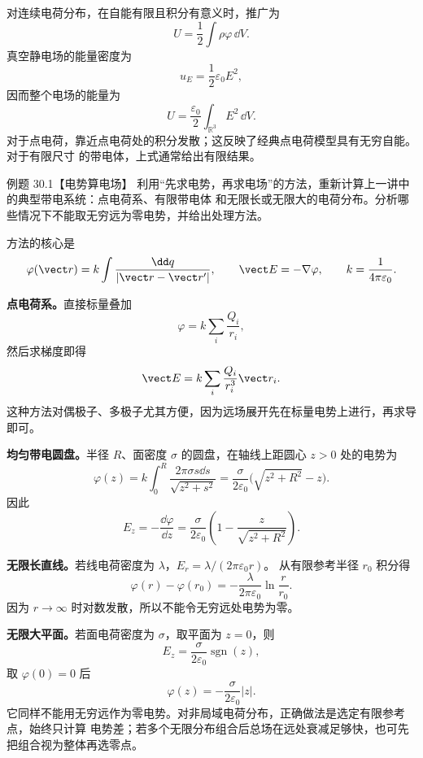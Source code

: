 对连续电荷分布，在自能有限且积分有意义时，推广为
\begin{equation}
  U=\frac12\int\rho\varphi\,\dd V.
\end{equation}
真空静电场的能量密度为
\begin{equation}
  \boxed{u_E=\frac12\varepsilon_0E^2},
\end{equation}
因而整个电场的能量为
\begin{equation}
  \boxed{U=\frac{\varepsilon_0}{2}
  \int_{\mathbb R^3}E^2\,\dd V}.
\end{equation}
对于点电荷，靠近点电荷处的积分发散；这反映了经典点电荷模型具有无穷自能。对于有限尺寸
的带电体，上式通常给出有限结果。





\Needspace{0.34\textheight}
\begin{origexamplebox}{例题 30.1【电势算电场】}
利用“先求电势，再求电场”的方法，重新计算上一讲中的典型带电系统：点电荷系、有限带电体
和无限长或无限大的电荷分布。分析哪些情况下不能取无穷远为零电势，并给出处理方法。
\end{origexamplebox}

\begin{xesolution}
方法的核心是
\[
  \varphi(\vect r)=k\int\frac{\dd q}{|\vect r-\vect r'|},
  \qquad
  \vect E=-\nabla\varphi,
  \qquad k=\frac1{4\pi\varepsilon_0}.
\]

\textbf{点电荷系。}直接标量叠加
\[
  \varphi=k\sum_i\frac{Q_i}{r_i},
\]
然后求梯度即得
\[
  \vect E=k\sum_i\frac{Q_i}{r_i^3}\vect r_i.
\]
这种方法对偶极子、多极子尤其方便，因为远场展开先在标量电势上进行，再求导即可。

\textbf{均匀带电圆盘。}半径 $R$、面密度 $\sigma$ 的圆盘，在轴线上距圆心 $z>0$ 处的电势为
\[
  \varphi(z)=k\int_0^R\frac{2\pi\sigma s\dd s}{\sqrt{z^2+s^2}}
  =\frac{\sigma}{2\varepsilon_0}
  \bigl(\sqrt{z^2+R^2}-z\bigr).
\]
因此
\[
  \boxed{E_z=-\frac{\dd\varphi}{\dd z}
  =\frac{\sigma}{2\varepsilon_0}
  \left(1-\frac{z}{\sqrt{z^2+R^2}}\right)}.
\]

\textbf{无限长直线。}若线电荷密度为 $\lambda$，$E_r=\lambda/(2\pi\varepsilon_0r)$。
从有限参考半径 $r_0$ 积分得
\[
  \boxed{\varphi(r)-\varphi(r_0)
  =-\frac{\lambda}{2\pi\varepsilon_0}\ln\frac r{r_0}}.
\]
因为 $r\to\infty$ 时对数发散，所以不能令无穷远处电势为零。

\textbf{无限大平面。}若面电荷密度为 $\sigma$，取平面为 $z=0$，则
\[
  E_z=\frac{\sigma}{2\varepsilon_0}\operatorname{sgn}(z),
\]
取 $\varphi(0)=0$ 后
\[
  \boxed{\varphi(z)=-\frac{\sigma}{2\varepsilon_0}|z|}.
\]
它同样不能用无穷远作为零电势。对非局域电荷分布，正确做法是选定有限参考点，始终只计算
电势差；若多个无限分布组合后总场在远处衰减足够快，也可先把组合视为整体再选零点。
\end{xesolution}

